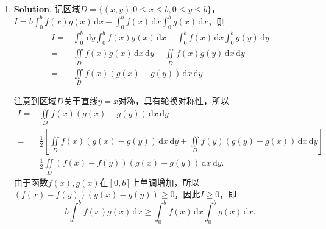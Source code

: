 \documentclass[../main.tex]{subfiles}
\begin{document}
\begin{enumerate}
    \item \textbf{Solution}. 记区域$D=\{(x,y)|0\leq x\leq b,0\leq y\leq b\}$，$I
              =b\int_{0}^{b}f(x)g(x)\,\mathrm{d}x-\int_{0}^{b}f(x)\,\mathrm{d}x\int_{0}^{b}g(
              x)\,\mathrm{d}x$，则
          \[
              \begin{aligned}
                  I = {} & \int_{0}^{b}\,\mathrm{d}y\int_{0}^{b}f(x)g(x)\,\mathrm{d}x - \int_{0}^{b}f(x)\,\mathrm{d}x\int_{0}^{b}g(y)\,\mathrm{d}y \\
                  = {}   & \iint\limits_{D}f(x)g(x)\,\mathrm{d}x\,\mathrm{d}y - \iint\limits_{D}f(x)g(y)\,\mathrm{d}x\,\mathrm{d}y                 \\
                  = {}   & \iint\limits_{D}f(x)\left(g(x)-g(y)\right)\,\mathrm{d}x\,\mathrm{d}y.
              \end{aligned}
          \]

          注意到区域$D$关于直线$y=x$对称，具有轮换对称性，所以
          \[
              \begin{aligned}
                  I = {} & \iint\limits_{D}f(x)\left(g(x)-g(y)\right)\,\mathrm{d}x\,\mathrm{d}y                                                                                                \\
                  = {}   & \frac{1}{2}\left[\iint\limits_{D}f(x)\left(g(x)-g(y)\right)\,\mathrm{d}x\,\mathrm{d}y + \iint\limits_{D}f(y)\left(g(y)-g(x)\right)\,\mathrm{d}x\,\mathrm{d}y\right] \\
                  = {}   & \frac{1}{2}\iint\limits_{D}\left(f(x)-f(y)\right)\left(g(x)-g(y)\right)\,\mathrm{d}x\,\mathrm{d}y.
              \end{aligned}
          \]
          由于函数$f(x),g(x)$在$[0,b]$上单调增加，所以$\left(f(x)-f(y)\right)\left(g(
              x)-g(y)\right)\geq 0$，因此$I\geq 0$，即
          \[
              b\int_{0}^{b}f(x)g(x)\,\mathrm{d}x\geq \int_{0}^{b}f(x)\,\mathrm{d}x\int_{0}^{b}
              g(x)\,\mathrm{d}x.
          \]

\end{enumerate}
\end{document}

